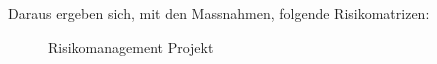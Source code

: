 \begin{flushleft}
    Daraus ergeben sich, mit den Massnahmen, folgende Risikomatrizen:
    \begin{figure}[H]
        \centering
        \qquad
        \caption{Risikomanagement Projekt}
        \label{fig:riskmanagement_projekct}
    \end{figure}
\end{flushleft}
